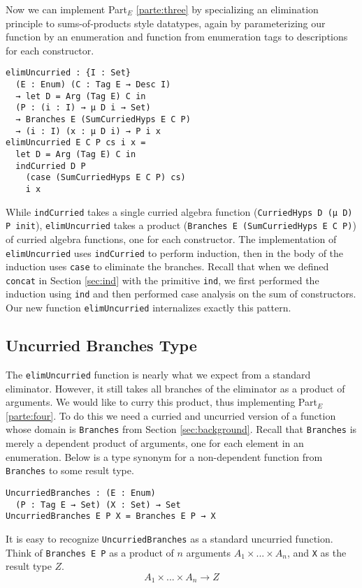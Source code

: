 \documentclass[nonatbib]{sigplanconf}
\newcommand{\refsec}[1]{Section \ref{sec:#1}}
\newcommand{\refparte}[1]{Part$_E$ \ref{parte:#1}}
\begin{document}
Now we can implement \refparte{three} by specializing an elimination
principle to sums-of-products style datatypes, again by parameterizing
our function by an enumeration and function from enumeration tags to
descriptions for each constructor.

\begin{verbatim}
elimUncurried : {I : Set} 
  (E : Enum) (C : Tag E → Desc I)
  → let D = Arg (Tag E) C in
  (P : (i : I) → μ D i → Set)
  → Branches E (SumCurriedHyps E C P)
  → (i : I) (x : μ D i) → P i x
elimUncurried E C P cs i x =
  let D = Arg (Tag E) C in
  indCurried D P
    (case (SumCurriedHyps E C P) cs)
    i x
\end{verbatim}

While {\tt indCurried} takes a single curried algebra function
({\tt CurriedHyps D (μ D) P init}), {\tt elimUncurried} takes a
product ({\tt Branches E (SumCurriedHyps E C P)})
of curried algebra functions, one for each constructor. The
implementation of {\tt elimUncurried} uses {\tt indCurried} to perform
induction, then in the body of the induction uses {\tt case} to
eliminate the branches. Recall that when we defined {\tt concat} in
\refsec{ind} with the primitive {\tt ind}, we first performed the
induction using {\tt ind} and then performed case analysis on the sum
of constructors. Our new function {\tt elimUncurried} internalizes
exactly this pattern.

\subsection{Uncurried Branches Type}

The {\tt elimUncurried} function is nearly what we expect from a
standard eliminator. However, it still takes all branches of the
eliminator as a product of arguments. We would like to curry this
product, thus implementing \refparte{four}.
To do this we need a curried and uncurried
version of a function whose domain is {\tt Branches}
from \refsec{background}. Recall that {\tt Branches} is merely a
dependent product of arguments, one for each element in an
enumeration. Below is a type synonym for a non-dependent function from
{\tt Branches} to some result type.

\begin{verbatim}
UncurriedBranches : (E : Enum)
  (P : Tag E → Set) (X : Set) → Set
UncurriedBranches E P X = Branches E P → X
\end{verbatim}

It is easy to recognize {\tt UncurriedBranches} as a standard
uncurried function. Think of {\tt Branches E P} as a product of
$n$ arguments $A_1 × ... × A_n$, 
and {\tt X} as the result type $Z$.
\[
A_1 × ... × A_n → Z
\]
\end{document}
